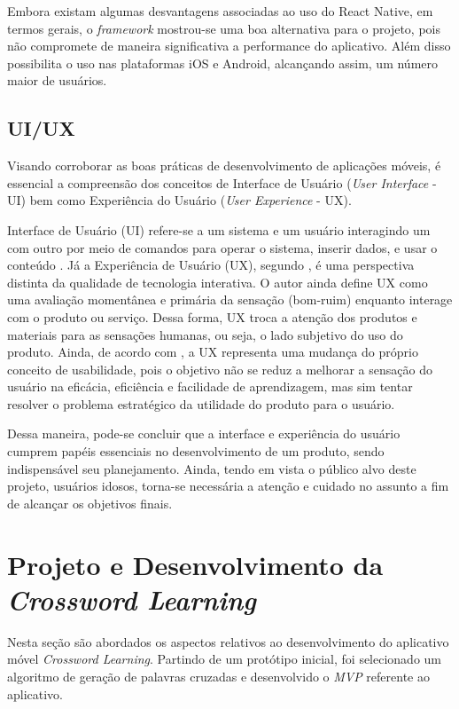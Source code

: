 Embora existam algumas desvantagens associadas ao uso do React Native, em termos gerais, o \textit{framework} mostrou-se uma boa alternativa para o projeto, pois não compromete de maneira significativa a performance do aplicativo. Além disso possibilita o uso nas plataformas iOS e Android, alcançando assim, um número maior de usuários.

\subsection{UI/UX}
Visando corroborar as boas práticas de desenvolvimento de aplicações móveis, é essencial a compreensão dos conceitos de Interface de Usuário (\textit{User Interface} - UI) bem como Experiência do Usuário (\textit{User Experience} - UX). %

Interface de Usuário (UI) refere-se a um sistema e um usuário interagindo um com outro por meio de comandos para operar o sistema, inserir dados, e usar o conteúdo \citep{joo2015}. Já a Experiência de Usuário (UX), segundo \cite{marc2008}, é uma perspectiva distinta da qualidade de tecnologia interativa. O autor ainda define UX como uma avaliação momentânea e primária da sensação (bom-ruim) enquanto interage com o produto ou serviço. Dessa forma, UX troca a atenção dos produtos e materiais para as sensações humanas, ou seja, o lado subjetivo do uso do produto. Ainda, de acordo com \cite{castilla2017}, a UX representa uma mudança do próprio conceito de usabilidade, pois o objetivo não se reduz a melhorar a sensação do usuário na eficácia, eficiência e facilidade de aprendizagem, mas sim tentar resolver o problema estratégico da utilidade do produto para o usuário. 

Dessa maneira, pode-se concluir que a interface e experiência do usuário cumprem papéis essenciais no desenvolvimento de um produto, sendo indispensável seu planejamento. Ainda, tendo em vista o público alvo deste projeto, usuários idosos, torna-se necessária a atenção e cuidado no assunto a fim de alcançar os objetivos finais.

\section{Projeto e Desenvolvimento da \textit{Crossword Learning}}
Nesta seção são abordados os aspectos relativos ao desenvolvimento do aplicativo móvel \textit{Crossword Learning}. Partindo de um protótipo inicial, foi selecionado um algoritmo de geração de palavras cruzadas e desenvolvido o \textit{MVP} referente ao aplicativo.

